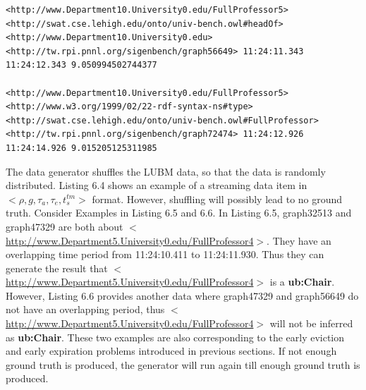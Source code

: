 \begin{lstlisting}[caption={\textbf{Generated RDF Stream Example 3}},basicstyle=\tiny]
<http://www.Department10.University0.edu/FullProfessor5>
<http://swat.cse.lehigh.edu/onto/univ-bench.owl#headOf>
<http://www.Department10.University0.edu>
<http://tw.rpi.pnnl.org/sigenbench/graph56649> 11:24:11.343 11:24:12.343 9.050994502744377

<http://www.Department10.University0.edu/FullProfessor5>
<http://www.w3.org/1999/02/22-rdf-syntax-ns#type>
<http://swat.cse.lehigh.edu/onto/univ-bench.owl#FullProfessor>
<http://tw.rpi.pnnl.org/sigenbench/graph72474> 11:24:12.926 11:24:14.926 9.015205125311985
\end{lstlisting}

The data generator shuffles the LUBM data, so that the data is randomly distributed.
Listing 6.4 shows an example of a streaming data item in $<\rho, g, \tau_{a}, \tau_{e}, t^{tm}_{s}>$ format.
However, shuffling will possibly lead to no ground truth. 
Consider Examples in Listing 6.5 and 6.6. 
In Listing 6.5, graph32513 and graph47329 are both about $<$\url{http://www.Department5.University0.edu/FullProfessor4}$>$. 
They have an overlapping time period from 11:24:10.411 to 11:24:11.930.
Thus they can generate the result that $<$\url{http://www.Department5.University0.edu/FullProfessor4}$>$ is a \textbf{ub:Chair}.
However, Listing 6.6 provides another data where graph47329 and graph56649 do not have an overlapping period, thus $<$\url{http://www.Department5.University0.edu/FullProfessor4}$>$ will not be inferred as \textbf{ub:Chair}.
These two examples are also corresponding to the early eviction and early expiration problems introduced in previous sections. 
If not enough ground truth is produced, the generator will run again till enough ground truth is produced.

%
